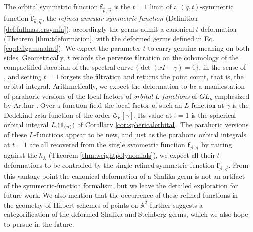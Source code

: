 \documentclass{amsart}
\numberwithin{equation}{section}
\theoremstyle{definition}
\def\16{{\bf 16}}
\def\1{{\bf 1}}
\def\hat{\widehat}
\newcommand{\frs}{\mathbf{f}_{\vec{p},\vec{q}}}
\newcommand{\fpq}{\frs}
\newcommand{\cO}{\mathcal{O}}
\newcommand{\A}{\mathbb{A}}
\newcommand{\fqrs}{\hat{\mathbf{f}}_{\vec{p},\vec{q}}}
\begin{document}
The orbital symmetric function $\fpq$ is the $t=1$ limit of a $(q,t)$-symmetric function $\fqrs$, the \emph{refined annular symmetric function} (Definition \ref{def:fullmastersymfn}); accordingly the germs admit a canonical $t$-deformation (Theorem \ref{thm:tdeformation}, with the deformed germs defined in Eq. \eqref{eq:deffgammahat}). We expect the parameter $t$ to carry genuine meaning on both sides. Geometrically, $t$ records the perverse filtration on the cohomology of the compactified Jacobian of the spectral curve $\{\det(xI-\gamma)=0\}$, in the sense of \cite{ORS}, and setting $t=1$ forgets the filtration and returns the point count, that is, the orbital integral. Arithmetically, we expect the deformation to be a manifestation of parahoric versions of the local factors of \emph{orbital $L$-functions} of $GL_n$ emphasized by Arthur \cite{Arthur}. Over a function field the local factor of such an $L$-function at $\gamma$ is the Dedekind zeta function of the order $\cO_F[\gamma]$. Its 
value at $t=1$ is the spherical orbital integral $I_\gamma(\1_{(n)})$ of Corollary \ref{cor:sphericalorbital}. The parahoric versions of 
these $L$-functions appear to be new, and just as the parahoric orbital integrals at $t=1$ are all recovered from the single symmetric function $\fpq$ by pairing against the $h_\lambda$ (Theorem \ref{thm:weightpolynomials}), we expect all their $t$-deformations to be controlled by the single refined symmetric function $\fqrs$. From this vantage point the canonical deformation of a Shalika germ is not an artifact of the symmetric-function formalism, but we leave the detailed exploration for future work.
We also mention that the occurrence of these refined functions in the geometry of Hilbert schemes of points on $\A^2$ further suggests a categorification of the deformed Shalika and Steinberg germs, which we also hope to pursue in the future.
\end{document}
